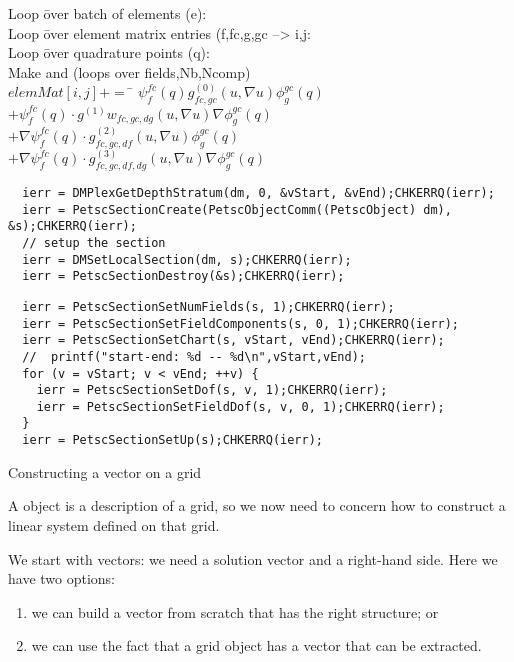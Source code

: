 \begin{tabbing}
  Loop \=over batch of elements (e):\\
  \>Loop \=over element matrix entries (f,fc,g,gc --> i,j:\\
  \>\>Loop \=over quadrature points (q):\\
  \>\>\>Make  and  (loops over fields,Nb,Ncomp)\\
  \>\>\>$elemMat[i,j] += $ \= $\psi^{fc}_f(q) g^{(0)}_{fc,gc}(u, \nabla u) \phi^{gc}_g(q)$\\
  \>\>\>\> $+ \psi^{fc}_f(q) \cdot g^{(1)}w_{fc,gc,dg}(u, \nabla u) \nabla\phi^{gc}_g(q)$\\
  \>\>\>\> $+ \nabla\psi^{fc}_f(q) \cdot g^{(2)}_{fc,gc,df}(u, \nabla u) \phi^{gc}_g(q)$\\
  \>\>\>\> $+ \nabla\psi^{fc}_f(q) \cdot g^{(3)}_{fc,gc,df,dg}(u, \nabla u) \nabla\phi^{gc}_g(q)$\\
\end{tabbing}

\begin{lstlisting}
  ierr = DMPlexGetDepthStratum(dm, 0, &vStart, &vEnd);CHKERRQ(ierr);
  ierr = PetscSectionCreate(PetscObjectComm((PetscObject) dm), &s);CHKERRQ(ierr);
  // setup the section
  ierr = DMSetLocalSection(dm, s);CHKERRQ(ierr);
  ierr = PetscSectionDestroy(&s);CHKERRQ(ierr);
\end{lstlisting}

\begin{lstlisting}
  ierr = PetscSectionSetNumFields(s, 1);CHKERRQ(ierr);
  ierr = PetscSectionSetFieldComponents(s, 0, 1);CHKERRQ(ierr);
  ierr = PetscSectionSetChart(s, vStart, vEnd);CHKERRQ(ierr);
  //  printf("start-end: %d -- %d\n",vStart,vEnd);
  for (v = vStart; v < vEnd; ++v) {
    ierr = PetscSectionSetDof(s, v, 1);CHKERRQ(ierr);
    ierr = PetscSectionSetFieldDof(s, v, 0, 1);CHKERRQ(ierr);
  }
  ierr = PetscSectionSetUp(s);CHKERRQ(ierr);
\end{lstlisting}

 {Constructing a vector on a grid}

A  object is a description of a grid,
so we now need to concern how to construct a linear system
defined on that grid.

We start with vectors: we need a solution vector
and a right-hand side.
Here we have two options:
\begin{enumerate}
\item we can build a vector from scratch that has the right structure; or
\item we can use the fact that a grid object has a vector that can be extracted.
\end{enumerate}

